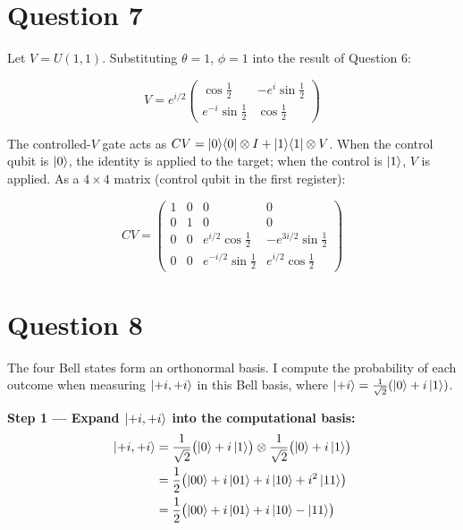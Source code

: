 \documentclass[12pt,a4paper]{article}
\begin{document}
\section*{Question 7}

Let $V=U(1,1)$. Substituting $\theta=1$, $\phi=1$ into the result of Question 6:

\[
  V = e^{i/2}
      \begin{pmatrix}
        \cos\tfrac{1}{2} & -e^{i}\sin\tfrac{1}{2}\\[6pt]
        e^{-i}\sin\tfrac{1}{2} & \cos\tfrac{1}{2}
      \end{pmatrix}
\]

The controlled-$V$ gate acts as $CV=\ket{0}\!\bra{0}\otimes I+\ket{1}\!\bra{1}\otimes V$.
When the control qubit is $\ket{0}$, the identity is applied to the target;
when the control is $\ket{1}$, $V$ is applied.
As a $4\times4$ matrix (control qubit in the first register):

\[
  \boxed{CV =
  \begin{pmatrix}
    1 & 0 & 0 & 0 \\[4pt]
    0 & 1 & 0 & 0 \\[4pt]
    0 & 0 & e^{i/2}\cos\tfrac{1}{2}  & -e^{3i/2}\sin\tfrac{1}{2} \\[4pt]
    0 & 0 & e^{-i/2}\sin\tfrac{1}{2} &  e^{i/2}\cos\tfrac{1}{2}
  \end{pmatrix}}
\]

\section*{Question 8}

The four Bell states form an orthonormal basis. I compute the probability of each
outcome when measuring $\ket{+i,+i}$ in this Bell basis,
where $\ket{+i}=\tfrac{1}{\sqrt{2}}(\ket{0}+i\ket{1})$.

\medskip
\textbf{Step 1 --- Expand $\ket{+i,+i}$ into the computational basis:}
\begin{align*}
\ket{+i,+i}
  &= \frac{1}{\sqrt{2}}\bigl(\ket{0}+i\ket{1}\bigr)
     \otimes
     \frac{1}{\sqrt{2}}\bigl(\ket{0}+i\ket{1}\bigr) \\
  &= \frac{1}{2}\bigl(\ket{00}+i\ket{01}+i\ket{10}+i^2\ket{11}\bigr) \\
  &= \frac{1}{2}\bigl(\ket{00}+i\ket{01}+i\ket{10}-\ket{11}\bigr)
\end{align*}
\end{document}
